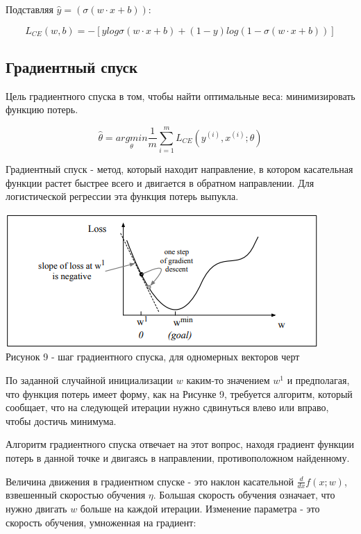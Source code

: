 \documentclass[a4paper,12pt,preview]{report} %
\begin{document}
	Подставляя $\hat{y} = (\sigma(w \cdot x + b))$:
	
	\begin{equation}
	L_{CE}(w, b) = -[y log \sigma(w \cdot x + b) + (1 - y) log(1 - \sigma(w \cdot x + b))]
	\end{equation}
	
	
	\subsection{Градиентный спуск}
	
	Цель градиентного спуска \cite{17} в том, чтобы найти оптимальные веса: минимизировать функцию потерь.
	
	\begin{equation}
	\hat{\theta} = \underset{\theta}{argmin} \dfrac{1}{m} \sum_{i=1}^{m} L_{CE} (y^{(i)}, x^{(i)}; \theta)
	\end{equation}
	
	Градиентный спуск - метод, который находит направление, в котором касательная функции растет быстрее всего и двигается в обратном направлении. Для логистической регрессии эта функция потерь выпукла.
	
	
	\begin{center}
		\includegraphics[scale=0.9]{gradstep.PNG}
		\\Рисунок 9 - шаг градиентного спуска, для одномерных векторов черт
	\end{center}
	
	По заданной случайной инициализации $w$ каким-то значением $w^1$ и предполагая, что функция потерь имеет форму, как на Рисунке 9, требуется алгоритм, который сообщает, что на следующей итерации нужно сдвинуться влево или вправо, чтобы достичь минимума.
	
	Алгоритм градиентного спуска отвечает на этот вопрос, находя градиент функции потерь в данной точке и двигаясь в направлении, противоположном найденному.
	
	Величина движения в градиентном спуске - это наклон касательной $\frac{d}{dx}f(x;w)$, взвешенный скоростью обучения $\eta$. Большая скорость обучения означает, что нужно двигать $w$ больше на каждой итерации. Изменение параметра - это скорость обучения, умноженная на градиент:
	
\end{document}
